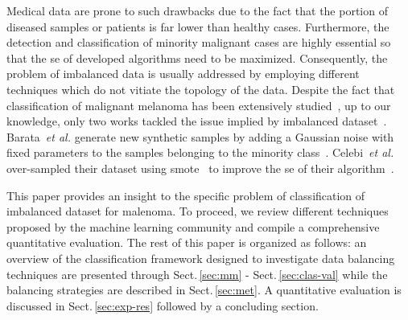 Medical data are prone to such drawbacks due to the fact that the portion of diseased samples or patients is far lower than healthy cases.
Furthermore, the detection and classification of minority malignant cases are highly essential so that the \ac{se} of developed algorithms need to be maximized.
Consequently, the problem of imbalanced data is usually addressed by employing different techniques which do not vitiate the topology of the data.
Despite the fact that classification of malignant melanoma has been extensively studied~\cite{rastgoo2015automatic}, up to our knowledge, only two works tackled the issue implied by imbalanced dataset~\cite{barata2013two,celebi2007methodological}.
Barata~\emph{et al.} generate new synthetic samples by adding a Gaussian noise with fixed parameters to the samples belonging to the minority class~\cite{barata2013two}.
Celebi~\emph{et al.} over-sampled their dataset using \ac{smote}~\cite{chawla2002smote} to improve the \ac{se} of their algorithm~\cite{celebi2007methodological}.

This paper provides an insight to the specific problem of classification of imbalanced dataset for malenoma. 
To proceed, we review different techniques proposed by the machine learning community and compile a comprehensive quantitative evaluation. 
The rest of this paper is organized as follows: an overview of the classification framework designed to investigate data balancing techniques are presented through Sect.\,\ref{sec:mm} - Sect.\,\ref{sec:clas-val} while the balancing strategies are described in Sect.\,\ref{sec:met}.
A quantitative evaluation is discussed in Sect.\,\ref{sec:exp-res} followed by a concluding section.




